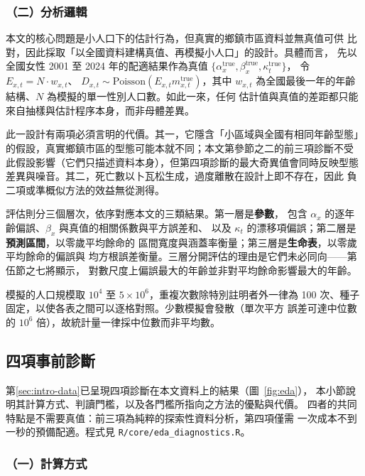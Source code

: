 \documentclass[UTF8, fontset=macnew, a4paper, 12pt]{ctexart}
\begin{document}
\subsubsection{（二）分析邏輯}

本文的核心問題是小人口下的估計行為，但真實的鄉鎮市區資料並無真值可供
比對，因此採取「以全國資料建構真值、再模擬小人口」的設計。具體而言，
先以全國女性 2001 至 2024 年的配適結果作為真值
$\{\alpha^{\text{true}}_x,\beta^{\text{true}}_x,\kappa^{\text{true}}_t\}$，
令 $E_{x,t}=N\cdot w_{x,t}$、
$D_{x,t}\sim\text{Poisson}(E_{x,t}m^{\text{true}}_{x,t})$，其中 $w_{x,t}$
為全國最後一年的年齡結構、$N$ 為模擬的單一性別人口數。如此一來，任何
估計值與真值的差距都只能來自抽樣與估計程序本身，而非母體差異。

此一設計有兩項必須言明的代價。其一，它隱含「小區域與全國有相同年齡型態」
的假設，真實鄉鎮市區的型態可能本就不同；本文第參節之二的前三項診斷不受
此假設影響（它們只描述資料本身），但第四項診斷的最大奇異值會同時反映型態
差異與噪音。其二，死亡數以卜瓦松生成，過度離散在設計上即不存在，因此
負二項或準概似方法的效益無從測得。

評估則分三個層次，依序對應本文的三類結果。第一層是\textbf{參數}，
包含 $\alpha_x$ 的逐年齡偏誤、$\beta_x$ 與真值的相關係數與平方誤差和、
以及 $\kappa_t$ 的漂移項偏誤；第二層是\textbf{預測區間}，以零歲平均餘命的
區間寬度與涵蓋率衡量；第三層是\textbf{生命表}，以零歲平均餘命的偏誤與
均方根誤差衡量。三層分開評估的理由是它們未必同向——第伍節之七將顯示，
對數尺度上偏誤最大的年齡並非對平均餘命影響最大的年齡。

模擬的人口規模取 $10^4$ 至 $5\times10^6$，重複次數除特別註明者外一律為
100 次、種子固定，以使各表之間可以逐格對照。少數模擬會發散（單次平方
誤差可達中位數的 $10^6$ 倍），故統計量一律採中位數而非平均數。

\subsection{四項事前診斷}\label{sec:eda}

第\ref{sec:intro-data}已呈現四項診斷在本文資料上的結果（圖~\ref{fig:eda}），
本小節說明其計算方式、判讀門檻，以及各門檻所指向之方法的優點與代價。
四者的共同特點是不需要真值：前三項為純粹的探索性資料分析，第四項僅需
一次成本不到一秒的預備配適。程式見 \texttt{R/core/eda\_diagnostics.R}。

\subsubsection{（一）計算方式}
\end{document}
